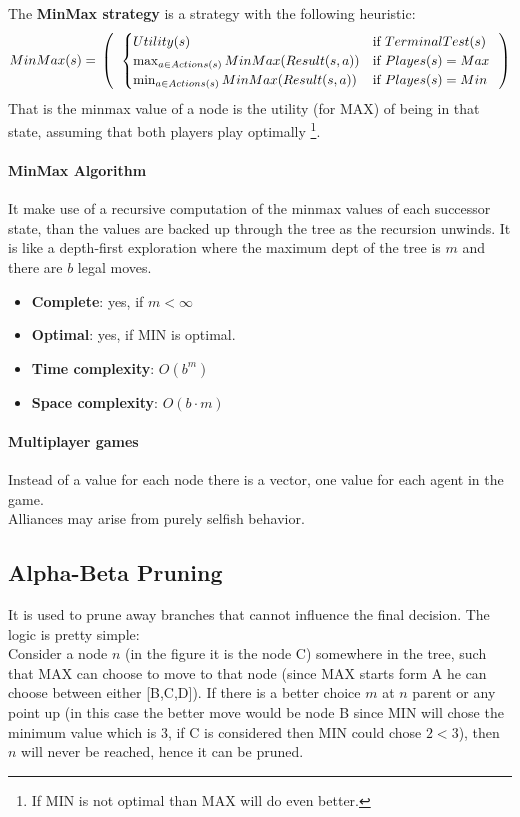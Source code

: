 \documentclass[10pt,a4paper]{article}
\begin{document}
The \textbf{MinMax strategy} is a strategy with the following heuristic:
\[MinMax(s)=\\
\left(
    \begin{tabular}{c c}
    $
    \begin{cases} 
    Utility(s)  & \mbox{if } TerminalTest(s)  \\ 
    \max_{a \in Actions(s)}MinMax(Result(s,a)) & \mbox{if } Playes(s)=Max\\
    \min_{a \in Actions(s)}MinMax(Result(s,a)) & \mbox{if } Playes(s)=Min\\
     \end{cases}
    $
    \end{tabular}
\right)
\]
That is the minmax value of a node is the utility (for MAX) of being in that state, assuming that both players play optimally  \footnote{If MIN is not optimal than MAX will do even better.}.

\paragraph{MinMax Algorithm} It make use of a recursive computation of the minmax values of each successor state, than the values are backed up through the tree as the recursion unwinds. It is like a depth-first exploration where the maximum dept of the tree is $m$ and there are $b$ legal moves.
\begin{itemize}
\item \textbf{Complete}: yes, if $m < \infty$
\item \textbf{Optimal}: yes, if MIN is optimal.
\item \textbf{Time complexity}: $O(b^m)$
\item \textbf{Space complexity}: $O(b\cdot m)$
\end{itemize}

\paragraph{Multiplayer games}
Instead of a value for each node there is a vector, one value for each agent in the game.\\ 
Alliances may arise from purely selfish behavior.

\subsection{Alpha-Beta Pruning}
It is used to prune away branches that cannot influence the final decision. The logic is pretty simple:\\
Consider a node $n$ (in the figure it is the node C) somewhere in the tree, such that MAX can choose to move to that node (since MAX starts form A he can choose between either [B,C,D]). If there is a better choice $m$ at $n$ parent or any point up (in this case the better move would be node B since MIN will chose the minimum value which is 3, if C is considered then MIN could chose $2<3$), then $n$ will never be reached, hence it can be pruned.
\end{document}
